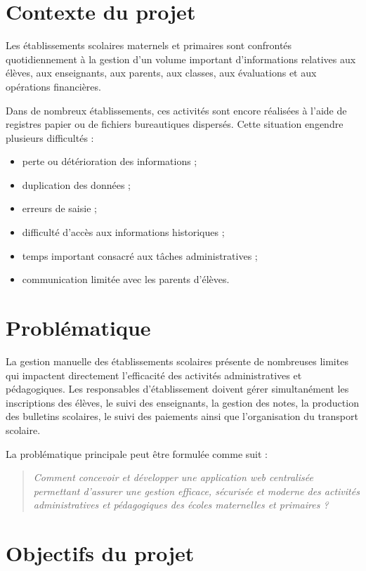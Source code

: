 \documentclass[12pt, a4paper]{report}
\begin{document}
\section{Contexte du projet}
Les établissements scolaires maternels et primaires sont confrontés quotidiennement à la gestion d'un volume important d'informations relatives aux élèves, aux enseignants, aux parents, aux classes, aux évaluations et aux opérations financières.

Dans de nombreux établissements, ces activités sont encore réalisées à l'aide de registres papier ou de fichiers bureautiques dispersés. Cette situation engendre plusieurs difficultés :
\begin{itemize}[noitemsep]
    \item perte ou détérioration des informations ;
    \item duplication des données ;
    \item erreurs de saisie ;
    \item difficulté d'accès aux informations historiques ;
    \item temps important consacré aux tâches administratives ;
    \item communication limitée avec les parents d'élèves.
\end{itemize}

\section{Problématique}
La gestion manuelle des établissements scolaires présente de nombreuses limites qui impactent directement l'efficacité des activités administratives et pédagogiques. Les responsables d'établissement doivent gérer simultanément les inscriptions des élèves, le suivi des enseignants, la gestion des notes, la production des bulletins scolaires, le suivi des paiements ainsi que l'organisation du transport scolaire.

La problématique principale peut être formulée comme suit :

\begin{quote}
\itshape Comment concevoir et développer une application web centralisée permettant d'assurer une gestion efficace, sécurisée et moderne des activités administratives et pédagogiques des écoles maternelles et primaires ?
\end{quote}

\section{Objectifs du projet}
\end{document}
